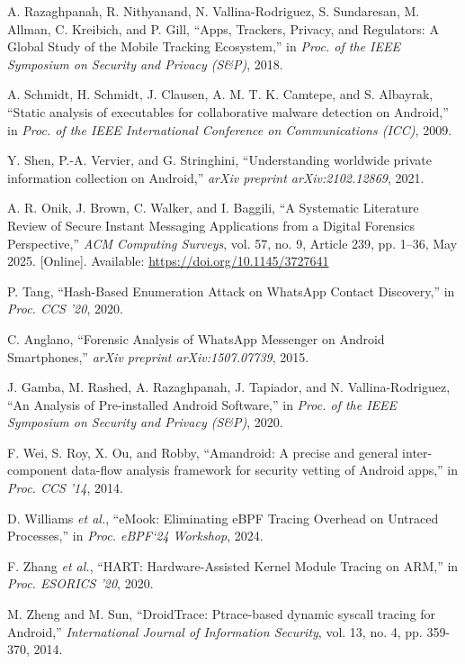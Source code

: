 \documentclass[a4paper,12pt]{report}
\begin{document}
\begin{thebibliography}{99}
A. Razaghpanah, R. Nithyanand, N. Vallina-Rodriguez, S. Sundaresan, M. Allman, C. Kreibich, and P. Gill, “Apps, Trackers, Privacy, and Regulators: A Global Study of the Mobile Tracking Ecosystem,” in \emph{Proc. of the IEEE Symposium on Security and Privacy (S\&P)}, 2018.

A. Schmidt, H. Schmidt, J. Clausen, A. M. T. K. Camtepe, and S. Albayrak, “Static analysis of executables for collaborative malware detection on Android,” in \emph{Proc. of the IEEE International Conference on Communications (ICC)}, 2009.

Y. Shen, P.-A. Vervier, and G. Stringhini, ``Understanding worldwide private information collection on Android,'' \emph{arXiv preprint arXiv:2102.12869}, 2021.

A. R. Onik, J. Brown, C. Walker, and I. Baggili, “A Systematic Literature Review of Secure Instant Messaging Applications from a Digital Forensics Perspective,” \emph{ACM Computing Surveys}, vol. 57, no. 9, Article 239, pp. 1–36, May 2025. [Online]. Available: \url{https://doi.org/10.1145/3727641}

P. Tang, “Hash-Based Enumeration Attack on WhatsApp Contact Discovery,” in \emph{Proc. CCS '20}, 2020.

C. Anglano, ``Forensic Analysis of WhatsApp Messenger on Android Smartphones,'' \emph{arXiv preprint arXiv:1507.07739}, 2015.

J. Gamba, M. Rashed, A. Razaghpanah, J. Tapiador, and N. Vallina-Rodriguez, “An Analysis of Pre-installed Android Software,” in \emph{Proc. of the IEEE Symposium on Security and Privacy (S\&P)}, 2020.

F. Wei, S. Roy, X. Ou, and Robby, “Amandroid: A precise and general inter-component data-flow analysis framework for security vetting of Android apps,” in \emph{Proc. CCS '14}, 2014.

D. Williams \emph{et al.}, “eMook: Eliminating eBPF Tracing Overhead on Untraced Processes,” in \emph{Proc. eBPF‘24 Workshop}, 2024.

F. Zhang \emph{et al.}, “HART: Hardware-Assisted Kernel Module Tracing on ARM,” in \emph{Proc. ESORICS '20}, 2020.

M. Zheng and M. Sun, “DroidTrace: Ptrace-based dynamic syscall tracing for Android,” \emph{International Journal of Information Security}, vol. 13, no. 4, pp. 359-370, 2014.


\end{thebibliography}
\end{document}
